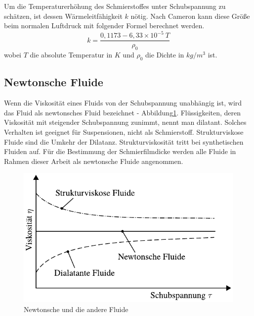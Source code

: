 Um die Temperaturerhöhung des Schmierstoffes unter Schubspannung zu schätzen, ist dessen Wärmeleitfähigkeit $k$ nötig.
Nach Cameron\cite{cameron} kann diese Größe beim normalen Luftdruck mit folgender Formel berechnet werden.
\begin{equation}
    \label{eq:waermeleitfaehigkeit}
    k = \frac{0,1173 - 6,33 \times 10^{-5} \ T}{\rho_0}
\end{equation}
%
wobei $T$ die absolute Temperatur in $K$ und $\rho_0$ die Dichte in $kg/m^3$ ist.

\subsection*{Newtonsche Fluide}
\label{sub:newtonsche_fluide}

Wenn die Viskosität eines Fluids von der Schubspannung unabhängig ist, wird das Fluid als newtonsches Fluid bezeichnet - Abbildung\ref{fig:newtonsche_fluide}.
Flüssigkeiten, deren Viskosität mit steigender Schubspannung zunimmt, nennt man dilatant.
Solches Verhalten ist geeignet für Suspensionen, nicht als Schmierstoff.
Strukturviskose Fluide sind die Umkehr der Dilatanz.
Strukturviskosität tritt bei synthetischen Fluiden auf.
Für die Bestimmung der Schmierfilmdicke werden alle Fluide in Rahmen dieser Arbeit als newtonsche Fluide angenommen.
\begin{figure}[htb]
    \centering
    \includegraphics[]{./images/newtonsche_nichtnewtonsche_fluide.pdf}
    \caption{Newtonsche und die andere Fluide\cite{wisniewski}}
    \label{fig:newtonsche_fluide}
\end{figure}
%

